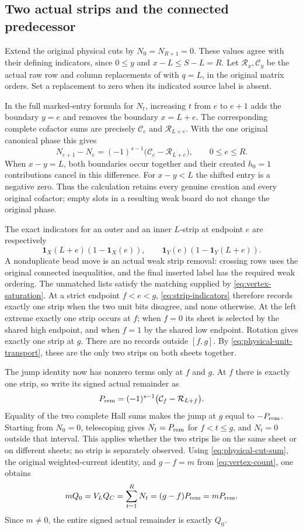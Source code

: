 \documentclass[11pt,a4paper]{amsart}
\numberwithin{equation}{section}
\theoremstyle{plain}
\theoremstyle{definition}
\newcommand{\one}{\mathbf1}
\begin{document}
\subsection{Two actual strips and the connected predecessor}

Extend the original physical cuts by \(N_0=N_{R+1}=0\).  These values
agree with their defining indicators, since \(0\le y\) and
\(x-L\le S-L=R\).  Let \(\mathcal R_x,\mathcal C_y\) be the actual raw
row and column replacements of  with
\(q=L\), in the original matrix orders.  Set a replacement to zero when
its indicated source label is absent.

In the full marked-entry formula for \(N_t\), increasing \(t\) from
\(e\) to \(e+1\) adds the boundary \(y=e\) and removes the boundary
\(x=L+e\).  The corresponding complete cofactor sums are precisely
\(\mathcal C_e\) and \(\mathcal R_{L+e}\).  With the one original
canonical phase this gives
\[
 N_{e+1}-N_e=(-1)^{s-1}
       \bigl(\mathcal C_e-\mathcal R_{L+e}\bigr),
 \qquad 0\le e\le R.
\]
When \(x-y=L\), both boundaries occur together and their created
\(h_0=1\) contributions cancel in this difference.  For \(x-y<L\)
the shifted entry is a negative zero.  Thus the calculation retains
every genuine creation and every original cofactor; empty slots in a
resulting weak board do not change the original phase.

The exact indicators for an outer and an inner \(L\)-strip at endpoint \(e\)
are respectively
\begin{equation}\label{eq:strip-indicators}
 \one_X(L+e)(1-\one_X(e)),\qquad
 \one_Y(e)(1-\one_Y(L+e)).
\end{equation}
A nonduplicate bead move is an actual weak strip removal: crossing rows
uses the original connected inequalities, and the final inserted label
has the required weak ordering.  The unmatched lists satisfy the
matching supplied by \eqref{eq:vertex-saturation}.  At a strict endpoint
\(f<e<g\), \eqref{eq:strip-indicators} therefore records exactly one strip
when the two unit bits disagree, and none otherwise.
At the left extreme exactly one strip occurs at \(f\); when \(f=0\) its sheet
is selected by the shared high endpoint, and when \(f=1\) by the shared low
endpoint.  Rotation gives exactly one strip at \(g\).  There are no records
outside \([f,g]\).  By \eqref{eq:physical-unit-transport}, these are the only
two strips on both sheets together.

The jump identity now has nonzero terms only at \(f\) and \(g\).
At \(f\) there is exactly one strip, so write its signed actual
remainder as
\[
 P_{\rm rem}=(-1)^{s-1}
       \bigl(\mathcal C_f-\mathcal R_{L+f}\bigr).
\]
Equality of the two complete Hall sums makes the jump at \(g\)
equal to \(-P_{\rm rem}\).  Starting from \(N_0=0\), telescoping gives
\(N_t=P_{\rm rem}\) for \(f<t\le g\), and \(N_t=0\) outside that
interval.  This applies whether the two strips lie on the same sheet
or on different sheets; no strip is separately observed.
Using \eqref{eq:physical-cut-sum}, the original weighted-current
identity, and \(g-f=m\) from \eqref{eq:vertex-count}, one obtains
\[
 mQ_0=V_LQ_C=\sum_{t=1}^{R}N_t
       =(g-f)P_{\rm rem}=mP_{\rm rem}.
\]
Since \(m\ne0\), the entire signed actual remainder is exactly \(Q_0\).
\end{document}
